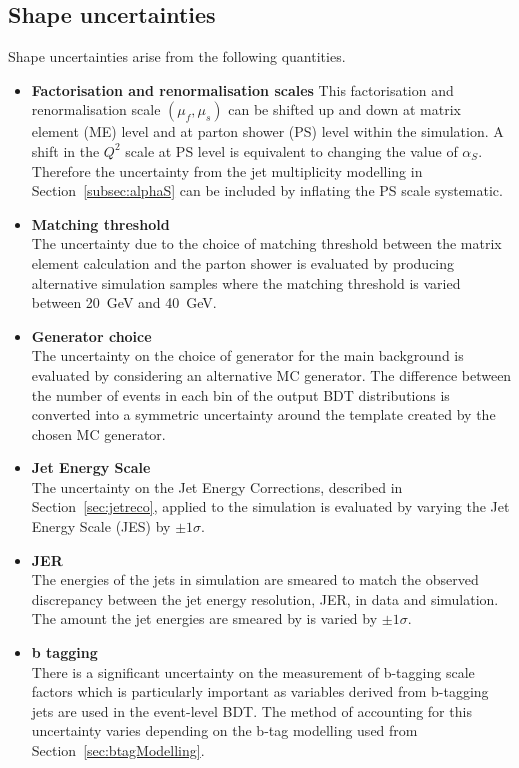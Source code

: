 \subsection{Shape uncertainties}
 Shape uncertainties arise from the following quantities.
\begin{itemize}
\item \textbf{Factorisation and renormalisation scales}
This factorisation and renormalisation scale $\left(\mu_{f},\mu_{s}\right)$ can be shifted up and down at matrix element (ME) level and at parton shower (PS) level within the simulation. A shift in the $Q^{2}$ scale at PS level is equivalent to changing the value of $\alpha_{S}$. Therefore the uncertainty from the jet multiplicity modelling in Section~\ref{subsec:alphaS} can be included by inflating the PS scale systematic.

\item \textbf{Matching threshold}\\
The uncertainty due to the choice of matching threshold between the matrix element calculation and the parton shower is evaluated by producing alternative simulation samples where the matching threshold is varied between 20~GeV and 40~GeV.

\item \textbf{Generator choice}\\
The uncertainty on the choice of generator for the main \ttbar background is evaluated by considering an alternative \ttbar MC generator. The difference between the number of events in each bin of the output BDT distributions is converted into a symmetric uncertainty around the template created by the chosen MC generator.

\item \textbf{Jet Energy Scale}\\
The uncertainty on the Jet Energy Corrections, described in Section~\ref{sec:jetreco}, applied to the simulation is evaluated by varying the Jet Energy Scale (JES) by $\pm 1\sigma$.

\item \textbf{JER}\\
The energies of the jets in simulation are smeared to match the observed discrepancy between the jet energy resolution, JER, in data and simulation. The amount the jet energies are smeared by is varied by $\pm 1\sigma$.

\item \textbf{b tagging}\\
There is a significant uncertainty on the measurement of b-tagging scale factors which is particularly important as variables derived from b-tagging jets are used in the event-level BDT. The method of accounting for this uncertainty varies depending on the b-tag modelling used from Section~\ref{sec:btagModelling}.


\end{itemize}
